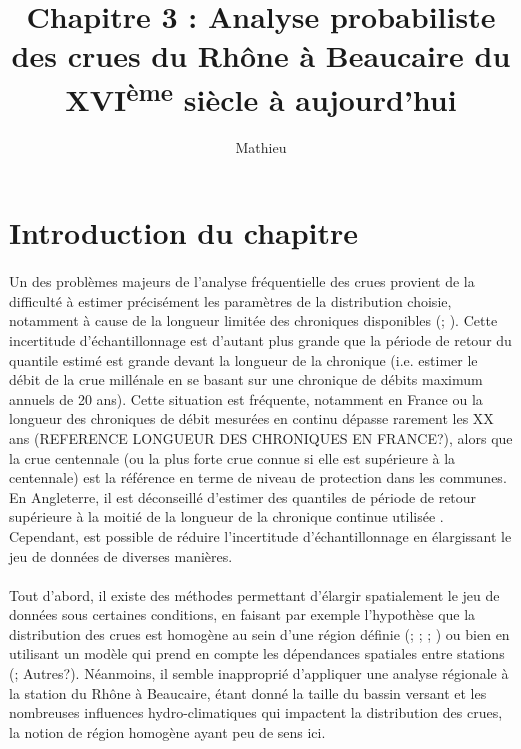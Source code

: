 \documentclass[11pt]{article}
\title{Chapitre 3 : Analyse probabiliste des crues du Rhône à Beaucaire du XVI\textsuperscript{ème} siècle à aujourd'hui}
\author{Mathieu}
\begin{document}
\maketitle

\tableofcontents

\section{Introduction du chapitre}

	\paragraph{} Un des problèmes majeurs de l'analyse fréquentielle des crues provient de la difficulté à estimer précisément les paramètres de la distribution choisie, notamment à cause de la longueur limitée des chroniques disponibles (\cite{kjeldsen_uncertainty_2011}; \cite{apel_flood_2004}). Cette incertitude d'échantillonnage est d'autant plus grande que la période de retour du quantile estimé est grande devant la longueur de la chronique (i.e. estimer le débit de la crue millénale en se basant sur une chronique de débits maximum annuels de 20 ans). Cette situation est fréquente, notamment en France ou la longueur des chroniques de débit mesurées en continu dépasse rarement les XX ans (REFERENCE LONGUEUR DES CHRONIQUES EN FRANCE?), alors que la  crue centennale (ou la plus forte crue connue si elle est supérieure à la centennale) est la référence en terme de niveau de protection dans les communes. En Angleterre, il est déconseillé d'estimer des quantiles de période de retour supérieure à la moitié de la longueur de la chronique continue utilisée \citep{whs_flood_nodate}. Cependant, est possible de réduire l'incertitude d'échantillonnage en élargissant le jeu de données de diverses manières.
	 
	\paragraph{}Tout d'abord, il existe des méthodes permettant d'élargir spatialement le jeu de données sous certaines conditions, en faisant par exemple l'hypothèse que la distribution des crues est homogène au sein d'une région définie (\cite{hosking_regional_1997}; \cite{gaume_bayesian_2010}; \cite{viglione_flood_2013}; \cite{nguyen_regional_2014}) ou bien en utilisant un modèle qui prend en compte les dépendances spatiales entre stations (\cite{sun_general_2014}; Autres?). Néanmoins, il semble inapproprié d'appliquer une analyse régionale à la station du Rhône à Beaucaire, étant donné la taille du bassin versant et les nombreuses influences hydro-climatiques qui impactent la distribution des crues, la notion de région homogène ayant peu de sens ici. 
	
\end{document}
